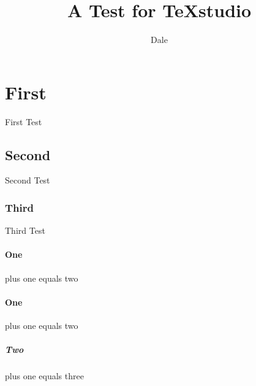 \documentclass{article}
\title{A Test for TeXstudio}
\author{Dale}
\begin{document}
\maketitle
\tableofcontents
\section{First} First Test
\subsection{Second} Second Test
\subsubsection{Third} Third Test
\paragraph{One} plus one equals two
\paragraph{One} plus one equals two
\subparagraph{Two} plus one equals three
\end{document}
